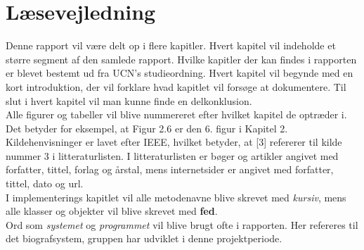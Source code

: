 \newpage
\section*{Læsevejledning}
Denne rapport vil være delt op i flere kapitler. Hvert kapitel vil indeholde et større segment af den samlede rapport.
Hvilke kapitler der kan findes i rapporten er blevet bestemt ud fra UCN's studieordning. 
Hvert kapitel vil begynde med en kort introduktion, der vil forklare hvad kapitlet vil forsøge at dokumentere. 
Til slut i hvert kapitel vil man kunne finde en delkonklusion.\\ 

Alle figurer og tabeller vil blive nummereret efter hvilket kapitel de optræder i. Det betyder for eksempel, at Figur 2.6 er den 
6. figur i Kapitel 2. \\

Kildehenvisninger er lavet efter IEEE, hvilket betyder, at [3] refererer til kilde nummer 3 i litteraturlisten. 
I litteraturlisten er bøger og artikler angivet med forfatter, tittel, forlag og årstal, mens internetsider er angivet med forfatter, tittel, dato og url. \\ 

I implementerings kapitlet vil alle metodenavne blive skrevet med \textit{kursiv}, mens alle klasser og objekter vil blive skrevet med \textbf{fed}.\\

Ord som \textit{systemet} og \textit{programmet} vil blive brugt ofte i rapporten. Her refereres til det biografsystem, gruppen har udviklet i denne projektperiode.
